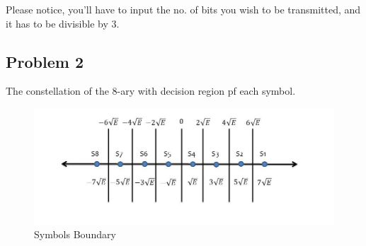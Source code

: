 \documentclass[a4paper,12pt]{report}
\begin{document}
        Please notice, you'll have to input the no. 
            of bits you wish to be transmitted, and it has to be divisible by 3.
    \subsection{Problem 2}
        The constellation of the 8-ary with decision region pf each symbol.
        \begin{figure}[h!]
            \includegraphics[width=\linewidth]{Figures/Figure_2.jpg}
            \caption{Symbols Boundary}
            \label{fig:Symbols}
        \end{figure}

    \vspace{1cm}
\end{document}
